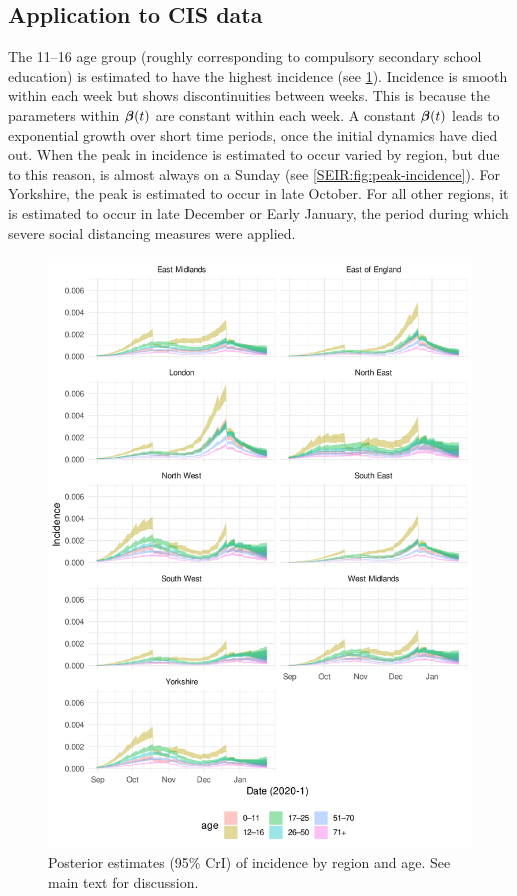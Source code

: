 \documentclass[thesis.tex]{subfiles}
\begin{document}
\subsection{Application to CIS data} \label{SEIR:sec:application}

The 11--16 age group (roughly corresponding to compulsory secondary school education) is estimated to have the highest incidence (see \cref{SEIR:fig:incidence}).
Incidence is smooth within each week but shows discontinuities between weeks.
This is because the parameters within $\bm{\beta}(t)$ are constant within each week.
A constant $\bm{\beta}(t)$ leads to exponential growth over short time periods, once the initial dynamics have died out.
When the peak in incidence is estimated to occur varied by region, but due to this reason, is almost always on a Sunday (see \cref{SEIR:fig:peak-incidence}).
For Yorkshire, the peak is estimated to occur in late October.
For all other regions, it is estimated to occur in late December or Early January, the period during which severe social distancing measures were applied.
\begin{figure}
    \includegraphics{SEIR/CIS/incidence}
    \caption[Posterior estimates of incidence]{%
        Posterior estimates (95\% CrI) of incidence by region and age.
        See main text for discussion.
    }
    \label{SEIR:fig:incidence}
\end{figure}
\end{document}
